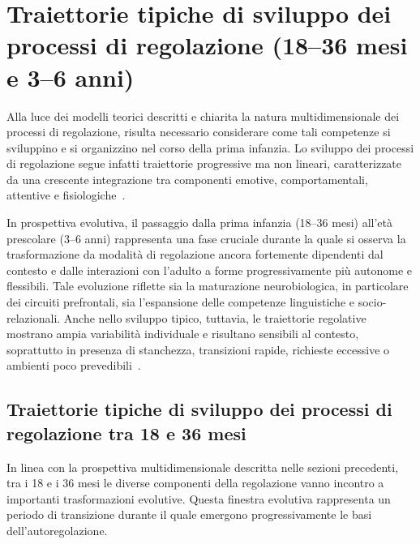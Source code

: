     \section{Traiettorie tipiche di sviluppo dei processi di regolazione (18--36 mesi e 3--6 anni)}
    \label{sec:1_6}

        Alla luce dei modelli teorici descritti e chiarita la natura multidimensionale dei processi di regolazione, risulta necessario considerare come tali competenze si sviluppino e si organizzino nel corso della prima infanzia. Lo sviluppo dei processi di regolazione segue infatti traiettorie progressive ma non lineari, caratterizzate da una crescente integrazione tra componenti emotive, comportamentali, attentive e fisiologiche~\cite{kopp1982,calkins2007}.

        In prospettiva evolutiva, il passaggio dalla prima infanzia (18--36 mesi) all'età prescolare (3--6 anni) rappresenta una fase cruciale durante la quale si osserva la trasformazione da modalità di regolazione ancora fortemente dipendenti dal contesto e dalle interazioni con l'adulto a forme progressivamente più autonome e flessibili. Tale evoluzione riflette sia la maturazione neurobiologica, in particolare dei circuiti prefrontali, sia l'espansione delle competenze linguistiche e socio-relazionali. Anche nello sviluppo tipico, tuttavia, le traiettorie regolative mostrano ampia variabilità individuale e risultano sensibili al contesto, soprattutto in presenza di stanchezza, transizioni rapide, richieste eccessive o ambienti poco prevedibili~\cite{blair2015}.

        \subsection{Traiettorie tipiche di sviluppo dei processi di regolazione tra 18 e 36 mesi}
        \label{sec:1_6_1}

            In linea con la prospettiva multidimensionale descritta nelle sezioni precedenti, tra i 18 e i 36 mesi le diverse componenti della regolazione vanno incontro a importanti trasformazioni evolutive. Questa finestra evolutiva rappresenta un periodo di transizione durante il quale emergono progressivamente le basi dell'autoregolazione.


